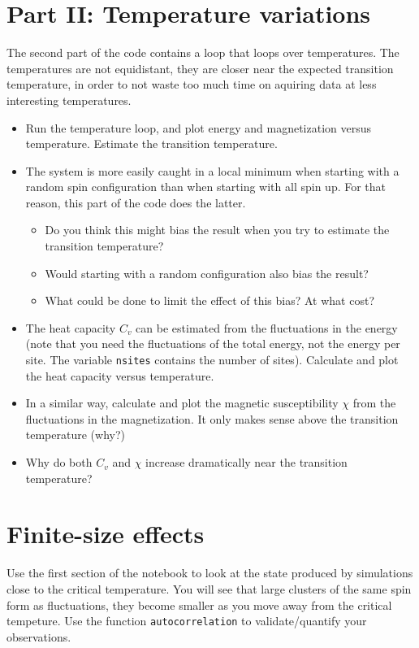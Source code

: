 \documentclass[a4paper,11pt]{article}
\begin{document}
\section{Part II: Temperature variations}

The second part of the code contains a loop that loops over
temperatures.  The temperatures are not equidistant, they are closer
near the expected transition temperature, in order to not waste too
much time on aquiring data at less interesting temperatures.

\begin{itemize}
\item Run the temperature loop, and plot energy and magnetization
  versus temperature.  Estimate the transition temperature.
\item The system is more easily caught in a local minimum when
  starting with a random spin configuration than when starting with
  all spin up.  For that reason, this part of the code does the
  latter.
  \begin{itemize}
  \item Do you think this might bias the result when you try to
    estimate the transition temperature?
  \item Would starting with a random configuration also bias the
    result?
    \item What could be done to limit the effect of this bias?  At
      what cost?
  \end{itemize}
\item The heat capacity $C_v$ can be estimated from the fluctuations
  in the energy (note that you need the fluctuations of the total
  energy, not the energy per site.  The variable \texttt{nsites}
  contains the number of sites).  Calculate and plot the heat capacity
  versus temperature.
\item In a similar way, calculate and plot the magnetic susceptibility
  $\chi$ from the fluctuations in the magnetization.  It only makes
  sense above the transition temperature (why?)
\item Why do both $C_v$ and $\chi$ increase dramatically near the
  transition temperature?
\end{itemize}

\section{Finite-size effects}

Use the first section of the notebook to look at the state produced by
simulations close to the critical temperature.  You will see that
large clusters of the same spin form as fluctuations, they become
smaller as you move away from the critical tempeture. Use the function
\texttt{autocorrelation} to validate/quantify your observations.
\end{document}
